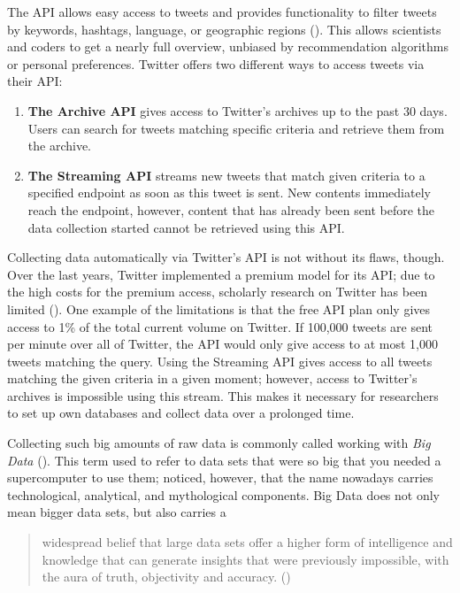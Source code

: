 The API allows easy access to tweets and provides functionality to filter tweets by keywords, hashtags, language, or geographic regions (\cite{bello2017detecting}). This allows scientists and coders to get a nearly full overview, unbiased by recommendation algorithms or personal preferences. Twitter offers two different ways to access tweets via their API:

\begin{enumerate}
    \item \textbf{The Archive API} gives access to Twitter's archives up to the past 30 days. Users can search for tweets matching specific criteria and retrieve them from the archive.
    \item \textbf{The Streaming API} streams new tweets that match given criteria to a specified endpoint as soon as this tweet is sent. New contents immediately reach the endpoint, however, content that has already been sent before the data collection started cannot be retrieved using this API.
\end{enumerate}

Collecting data automatically via Twitter's API is not without its flaws, though. Over the last years, Twitter implemented a premium model for its API; due to the high costs for the premium access, scholarly research on Twitter has been limited (\cite{brunsTwitterDataWhat2014}). One example of the limitations is that the free API plan only gives access to 1\% of the total current volume on Twitter. If 100,000 tweets are sent per minute over all of Twitter, the API would only give access to at most 1,000 tweets matching the query. Using the Streaming API gives access to all tweets matching the given criteria in a given moment; however, access to Twitter's archives is impossible using this stream. This makes it necessary for researchers to set up own databases and collect data over a prolonged time.

Collecting such big amounts of raw data is commonly called working with \emph{Big Data} (\cite{crawfordCriticalQuestionsBig2012}). This term used to refer to data sets that were so big that you needed a supercomputer to use them; \citeauthor{crawfordCriticalQuestionsBig2012} noticed, however, that the name nowadays carries technological, analytical, and mythological components. Big Data does not only mean bigger data sets, but also carries a 

\begin{quote}
    widespread belief that large data sets offer a higher form of intelligence and knowledge that can generate insights that were previously impossible, with the aura of truth, objectivity and accuracy. (\cite[3]{crawfordCriticalQuestionsBig2012})
\end{quote}

